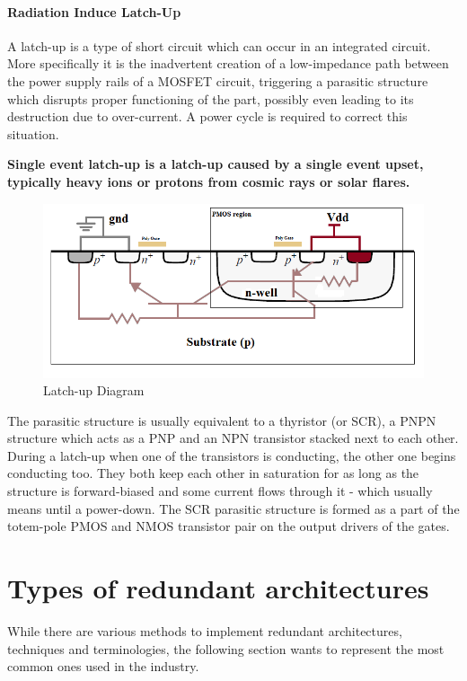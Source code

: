 \documentclass[./dissertation.tex]{subfiles}
\begin{document}
\paragraph{Radiation Induce Latch-Up}

A latch-up is a type of short circuit which can occur in an integrated circuit. More specifically it is the inadvertent creation of a low-impedance path between the power supply rails of a MOSFET circuit, triggering a parasitic structure which disrupts proper functioning of the part, possibly even leading to its destruction due to over-current. A power cycle is required to correct this situation.

\textbf{Single event latch-up is a latch-up caused by a single event upset, typically heavy ions or protons from cosmic rays or solar flares.}
\begin{figure}[h!]
\centering
  \includegraphics[scale = 0.50]{Latchup.png}
  \caption{Latch-up Diagram}
  \label{fig:coldred}
\end{figure}
The parasitic structure is usually equivalent to a thyristor (or SCR), a PNPN structure which acts as a PNP and an NPN transistor stacked next to each other. During a latch-up when one of the transistors is conducting, the other one begins conducting too. They both keep each other in saturation for as long as the structure is forward-biased and some current flows through it - which usually means until a power-down. The SCR parasitic structure is formed as a part of the totem-pole PMOS and NMOS transistor pair on the output drivers of the gates. 


\section{Types of redundant architectures}
While there are various methods to implement redundant architectures, techniques and terminologies, the following section wants to represent the most common ones used in the industry.
\end{document}
